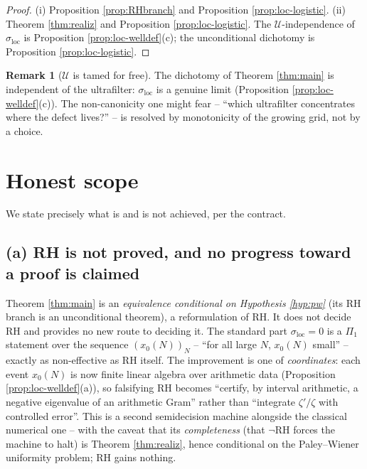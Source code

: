 \documentclass[11pt,reqno]{amsart}
\theoremstyle{definition}
\newtheorem{remark}[theorem]{Remark}
\begin{document}
\begin{proof}
(i) Proposition \ref{prop:RHbranch} and Proposition \ref{prop:loc-logistic}.
(ii) Theorem \ref{thm:realiz} and Proposition \ref{prop:loc-logistic}. The
\(\mathcal U\)-independence of \(\sigma_{\mathrm{loc}}\) is Proposition
\ref{prop:loc-welldef}(c); the unconditional dichotomy is Proposition
\ref{prop:loc-logistic}.
\end{proof}

\begin{remark}[\(\mathcal U\) is tamed for free]
The dichotomy of Theorem \ref{thm:main} is independent of the ultrafilter:
\(\sigma_{\mathrm{loc}}\) is a genuine limit (Proposition
\ref{prop:loc-welldef}(c)). The non-canonicity one might fear -- ``which
ultrafilter concentrates where the defect lives?'' -- is resolved by
monotonicity of the growing grid, not by a choice.
\end{remark}

\section{Honest scope}\label{sec:honest}

We state precisely what is and is not achieved, per the contract.

\subsection{(a) RH is not proved, and no progress toward a proof is claimed}
Theorem \ref{thm:main} is an \emph{equivalence conditional on Hypothesis
\ref{hyp:pw}} (its RH branch is an unconditional theorem), a reformulation of
RH. It does
not decide RH and provides no new route to deciding it. The standard part
\(\sigma_{\mathrm{loc}}=0\) is a \(\Pi_1\) statement over the sequence
\((x_0(N))_N\) -- ``for all large \(N\), \(x_0(N)\) small'' -- exactly as
non-effective as RH itself. The improvement is one of \emph{coordinates}: each
event \(x_0(N)\) is now finite linear algebra over arithmetic data (Proposition
\ref{prop:loc-welldef}(a)), so falsifying RH becomes ``certify, by interval
arithmetic, a negative eigenvalue
of an arithmetic Gram'' rather than ``integrate \(\zeta'/\zeta\) with controlled
error''. This is a second semidecision machine alongside the classical numerical
one -- with the caveat that its \emph{completeness} (that \(\neg\)RH forces the
machine to halt) is Theorem \ref{thm:realiz}, hence conditional on
the Paley--Wiener uniformity problem; RH gains nothing.
\end{document}
